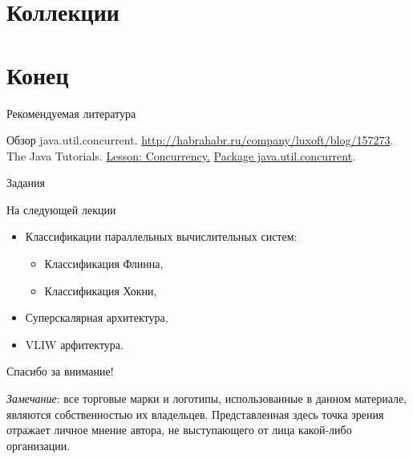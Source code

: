 \section{Коллекции}

\section*{Конец}

\begin{frame}[allowframebreaks]{Рекомендуемая литература}
\begin{thebibliography}{99}
    \bibitem{} Обзор java.util.concurrent.
    \url{http://habrahabr.ru/company/luxoft/blog/157273}.
    \bibitem{} The Java Tutorials.
    \href{http://docs.oracle.com/javase/tutorial/essential/concurrency/index.html}{Lesson: Concurrency.}
    \bibitem{} \href{http://docs.oracle.com/javase/7/docs/api/java/util/concurrent/package-summary.html}{Package java.util.concurrent}.
\end{thebibliography}
\end{frame}

\begin{frame}{Задания}
\end{frame}

\begin{frame}{На следующей лекции}
\begin{itemize}
    \item Классификации параллельных вычислительных систем:
    \begin{itemize}
        \item Классификация Флинна,
        \item Классификация Хокни,
    \end{itemize}
    \item Суперскалярная архитектура,
    \item VLIW арфитектура.
\end{itemize}
\end{frame}

\begin{frame}

{\huge{Спасибо за внимание!}\par}

\vfill

\tiny{\textit{Замечание}: все торговые марки и логотипы, использованные в данном материале, являются собственностью их владельцев. Представленная здесь точка зрения отражает личное мнение автора, не выступающего от лица какой-либо организации.}

\end{frame}


